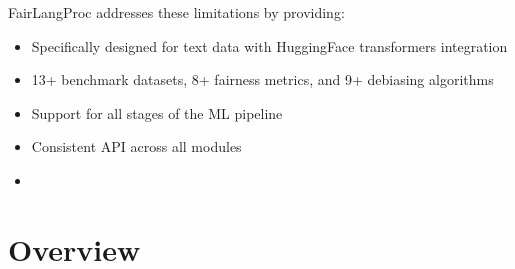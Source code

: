 \documentclass[letterpaper,10pt,english]{sphinxmanual}
\begin{document}
\sphinxAtStartPar
FairLangProc addresses these limitations by providing:
\begin{itemize}
\item {} 
\sphinxAtStartPar
{} \sphinxhyphen{} Specifically designed for text data with HuggingFace transformers integration

\item {} 
\sphinxAtStartPar
{} \sphinxhyphen{} 13+ benchmark datasets, 8+ fairness metrics, and 9+ debiasing algorithms

\item {} 
\sphinxAtStartPar
{} \sphinxhyphen{} Support for all stages of the ML pipeline

\item {} 
\sphinxAtStartPar
{} \sphinxhyphen{} Consistent API across all modules

\item {} 
\sphinxAtStartPar
{}

\end{itemize}


\section{Overview}
\label{\detokenize{getting_started:overview}}
\end{document}
